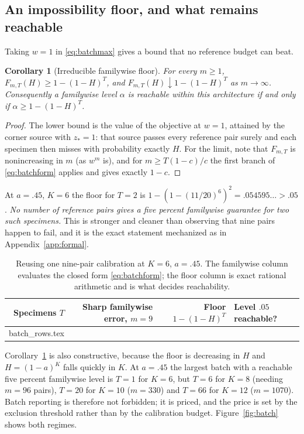 \documentclass[11pt]{article}
\makeatletter
\let\tableinput\@@input
\newtheorem{corollary}[theorem]{Corollary}
\theoremstyle{remark}\newtheorem{remark}[theorem]{Remark}
\makeatother
\begin{document}
\subsection{An impossibility floor, and what remains reachable}
Taking $w=1$ in \eqref{eq:batchmax} gives a bound that no reference budget can
beat.

\begin{corollary}[Irreducible familywise floor]\label{cor:floor}
For every $m\ge1$, $F_{m,T}(H)\ge1-(1-H)^T$, and $F_{m,T}(H)\downarrow1-(1-H)^T$
as $m\to\infty$. Consequently a familywise level $\alpha$ is reachable within
this architecture if and only if $\alpha\ge1-(1-H)^T$.
\end{corollary}
\begin{proof}
The lower bound is the value of the objective at $w=1$, attained by the corner
source with $z_*=1$: that source passes every reference pair surely and each
specimen then misses with probability exactly $H$. For the limit, note that
$F_{m,T}$ is nonincreasing in $m$ (as $w^m$ is), and for $m\ge T(1-c)/c$ the
first branch of \eqref{eq:batchform} applies and gives exactly $1-c$.
\end{proof}

At $a=.45$, $K=6$ the floor for $T=2$ is $1-(1-(11/20)^6)^2=.054595\ldots>.05$.
\emph{No number of reference pairs gives a five percent familywise guarantee for
two such specimens.} This is stronger and cleaner than observing that nine pairs
happen to fail, and it is the exact statement mechanized as
 in Appendix~\ref{app:formal}.

\begin{table}[tb]
\centering\small
\caption{Reusing one nine-pair calibration at $K=6$, $a=.45$. The familywise
column evaluates the closed form \eqref{eq:batchform}; the floor column is exact
rational arithmetic and is what decides reachability.}
\label{tab:batch}
\begin{tabular}{@{}rrrl@{}}\toprule
Specimens $T$ & Sharp familywise error, $m=9$ & Floor $1-(1-H)^T$ & Level $.05$ reachable?\\\midrule
\tableinput batch_rows.tex
\bottomrule\end{tabular}
\end{table}

Corollary~\ref{cor:floor} is also constructive, because the floor is decreasing
in $H$ and $H=(1-a)^K$ falls quickly in $K$. At $a=.45$ the largest batch with a
reachable five percent familywise level is $T=1$ for $K=6$, but $T=6$ for $K=8$
(needing $m=96$ pairs), $T=20$ for $K=10$ ($m=330$) and $T=66$ for $K=12$
($m=1070$). Batch reporting is therefore not forbidden; it is priced, and the
price is set by the exclusion threshold rather than by the calibration budget.
Figure~\ref{fig:batch} shows both regimes.
\end{document}
